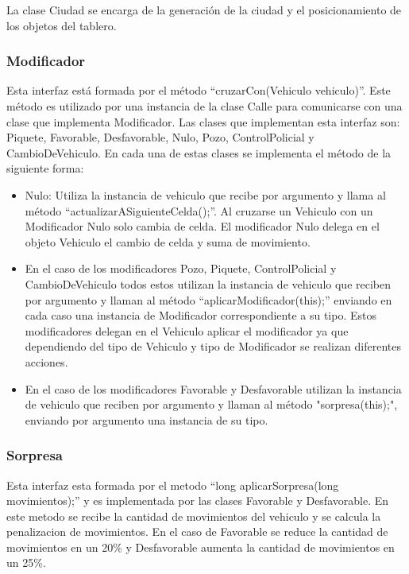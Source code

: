 \documentclass[titlepage,a4paper]{article}
\begin{document}
La clase Ciudad se encarga de la generación de la ciudad y el posicionamiento de los objetos del tablero.

\subsubsection[Modificador]{Modificador}

Esta interfaz está formada por el método “cruzarCon(Vehiculo vehiculo)”. Este método es utilizado por una instancia de la clase Calle para comunicarse con una clase que implementa Modificador.
Las clases que implementan esta interfaz son: Piquete, Favorable, Desfavorable, Nulo, Pozo, ControlPolicial y CambioDeVehiculo. En cada una de estas clases se implementa el método de la siguiente forma:

\begin{itemize}
  \item Nulo: Utiliza la instancia de vehiculo que recibe por argumento y llama al método “actualizarASiguienteCelda();”. Al cruzarse un Vehiculo con un Modificador Nulo solo cambia de celda. El modificador Nulo delega en el objeto Vehiculo el cambio de celda y suma de movimiento.
  \item En el caso de los modificadores Pozo, Piquete, ControlPolicial y CambioDeVehiculo todos estos utilizan la instancia de vehiculo que reciben por argumento y llaman al método “aplicarModificador(this);” enviando en cada caso una instancia de Modificador correspondiente a su tipo. Estos modificadores delegan en el Vehiculo aplicar el modificador ya que dependiendo del tipo de Vehiculo y tipo de Modificador se realizan diferentes acciones.
  \item En el caso de los modificadores Favorable y Desfavorable utilizan la instancia de vehiculo que reciben por argumento y llaman al método "sorpresa(this);", enviando por argumento una instancia de su tipo.
\end{itemize}
\subsubsection[Sorpresa]{Sorpresa}

Esta interfaz esta formada por el metodo  “long aplicarSorpresa(long movimientos);”  y es implementada por las clases Favorable y Desfavorable.
En este metodo se recibe la cantidad de movimientos del vehiculo y se calcula la penalizacion de movimientos. En el caso de Favorable se reduce la cantidad de movimientos en un 20\% y Desfavorable aumenta la cantidad de movimientos en un 25\%.
\end{document}
